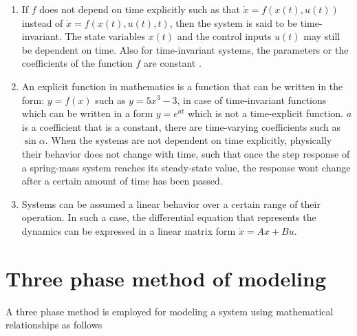 \begin{enumerate}
	\item If $f$ does not depend on time explicitly such as that $\dot{x} = f(x(t),u(t))$ instead of $\dot{x} = f(x(t),u(t),t)$, then the system is said to be time-invariant. The state variables $x(t)$ and the control inputs $u(t)$ may still be dependent on time. Also for time-invariant systems, the parameters or the coefficients of the function $f$ are constant \cite{CTMS2019_Modeling}.
	\item An explicit function in mathematics is a function that can be written in the form: $y = f(x)$ such as $y = 5x^3 - 3$, in case of time-invariant functions which can be written in a form $y = e^{at}$ which is not a time-explicit function. $a$ is a coefficient that is a constant, there are time-varying coefficients such as $\sin{\alpha}$. When the systems are not dependent on time explicitly, physically their behavior does not change with time, such that once the step response of a spring-mass system reaches its steady-state value, the response wont change after a certain amount of time has been passed.
	\item Systems can be assumed a linear behavior over a certain range of their operation. In such a case, the differential equation that represents the dynamics can be expressed in a linear matrix form $\dot{x} = Ax + Bu$.
\end{enumerate}

\section{Three phase method of modeling} \label{Sec_ThreePhaseModeling}

A three phase method is employed for modeling a system using mathematical relationships as follows


